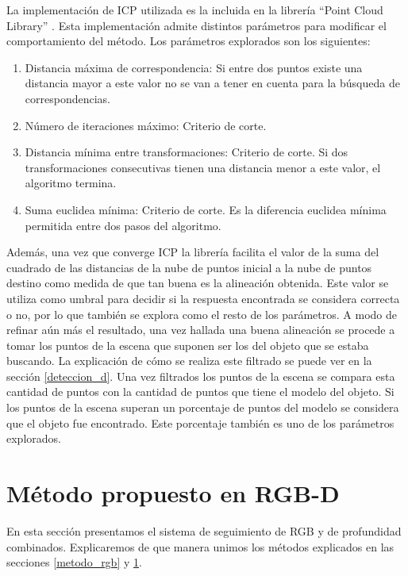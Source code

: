 La implementación de ICP utilizada es la incluida en la librería ``Point Cloud Library'' \cite{Rusu_ICRA2011_PCL}. Esta implementación admite distintos parámetros para modificar el comportamiento del método. Los parámetros explorados son los siguientes:

\begin{enumerate}
	\item Distancia máxima de correspondencia: Si entre dos puntos existe una distancia mayor a este valor no se van a tener en cuenta para la búsqueda de correspondencias.
	\item Número de iteraciones máximo: Criterio de corte.
	\item Distancia mínima entre transformaciones: Criterio de corte. Si dos transformaciones consecutivas tienen una distancia menor a este valor, el algoritmo termina.
	\item Suma euclidea mínima: Criterio de corte. Es la diferencia euclidea mínima permitida entre dos pasos del algoritmo.
\end{enumerate}

Además, una vez que converge ICP la librería facilita el valor de la suma del cuadrado de las distancias de la nube de puntos inicial a la nube de puntos destino como medida de que tan buena es la alineación obtenida. Este valor se utiliza como umbral para decidir si la respuesta encontrada se considera correcta o no, por lo que también se explora como el resto de los parámetros. A modo de refinar aún más el resultado, una vez hallada una buena alineación se procede a tomar los puntos de la escena que suponen ser los del objeto que se estaba buscando. La explicación de cómo se realiza este filtrado se puede ver en la sección \ref{deteccion_d}. Una vez filtrados los puntos de la escena se compara esta cantidad de puntos con la cantidad de puntos que tiene el modelo del objeto. Si los puntos de la escena superan un porcentaje de puntos del modelo se considera que el objeto fue encontrado. Este porcentaje también es uno de los parámetros explorados.


\section{Método propuesto en RGB-D}\label{metodo_rgbd}
En esta sección presentamos el sistema de seguimiento de RGB y de profundidad combinados. Explicaremos de que manera unimos los métodos explicados en las secciones \ref{metodo_rgb} y \ref{metodo_rgbd}.

